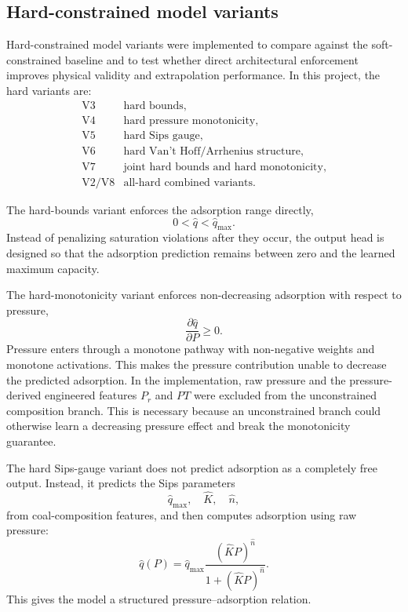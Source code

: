 \documentclass[11pt]{article}
\begin{document}
\subsection{Hard-constrained model variants}

Hard-constrained model variants were implemented to compare against the
soft-constrained baseline and to test whether direct architectural enforcement
improves physical validity and extrapolation performance. In this project, the
hard variants are:
\[
    \begin{array}{ll}
        \mathrm{V3}    & \text{hard bounds},                             \\
        \mathrm{V4}    & \text{hard pressure monotonicity},              \\
        \mathrm{V5}    & \text{hard Sips gauge},                         \\
        \mathrm{V6}    & \text{hard Van't Hoff/Arrhenius structure},     \\
        \mathrm{V7}    & \text{joint hard bounds and hard monotonicity}, \\
        \mathrm{V2/V8} & \text{all-hard combined variants}.
    \end{array}
\]

The hard-bounds variant enforces the adsorption range directly,
\[
    0 < \hat{q} < \hat{q}_{\max}.
\]
Instead of penalizing saturation violations after they occur, the output head
is designed so that the adsorption prediction remains between zero and the
learned maximum capacity.

The hard-monotonicity variant enforces non-decreasing adsorption with respect to pressure,
\[
    \frac{\partial \hat{q}}{\partial P} \geq 0.
\]
Pressure enters through a monotone pathway with non-negative weights and
monotone activations. This makes the pressure contribution unable to decrease
the predicted adsorption. In the implementation, raw pressure and the
pressure-derived engineered features \(P_r\) and \(PT\) were excluded from the
unconstrained composition branch. This is necessary because an unconstrained
branch could otherwise learn a decreasing pressure effect and break the
monotonicity guarantee.

The hard Sips-gauge variant does not predict adsorption as a completely free
output. Instead, it predicts the Sips parameters
\[
    \hat{q}_{\max}, \quad \hat{K}, \quad \hat{n},
\]
from coal-composition features, and then computes adsorption using raw pressure:
\[
    \hat{q}(P)
    =
    \hat{q}_{\max}
    \frac{(\hat{K}P)^{\hat{n}}}
    {1+(\hat{K}P)^{\hat{n}}}.
\]
This gives the model a structured pressure--adsorption relation.
\end{document}
